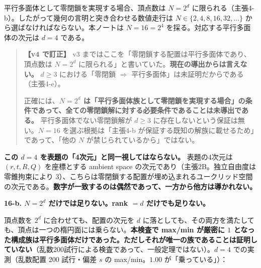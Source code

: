 \documentclass[
  10pt,
]{ltjsarticle}
\begin{document}
平行多面体として零閉鎖を実現する場合、頂点数は \(N = 2^d\)
に限られる（主張4-b）。したがって幾何の言明と突き合わせる数値走行は
\(N \in \{2, 4, 8, 16, 32, \dots\}\)
から選ばなければならない。本ノートは \(N = 16 = 2^4\)
を採る。対応する平行多面体の次元は \(d = 4\) である。

\begin{quote}
\textbf{【v4 で訂正】} v3
まではここを「零閉鎖する配置は平行多面体であり、頂点数は \(N=2^d\)
に限られる」と書いていた。\textbf{現在の導出からは言えない。} \(d\ge3\)
における「零閉鎖 \(\Rightarrow\)
平行多面体」は未証明だからである（主張4-e）。

正確には、\textbf{\(N = 2^d\)
は「平行多面体族として零閉鎖を実現する場合」の条件であって、全ての零閉鎖解に対する必要条件であることは未導出である。}
平行多面体でない零閉鎖解が \(d\ge3\)
に存在しないという保証は無い。\(N=16\) を選ぶ根拠は「主張4-b
が保証する既知の解族に載せるため」であって、「他の \(N\)
が禁じられているから」ではない。
\end{quote}

\textbf{この \(d = 4\) を表題の「4次元」と同一視してはならない。}
表題の4次元は \((r, t, R, Q)\) を座標とする ambient space
の次元であり（主張2B。独立自由度は零錐拘束により
3）、こちらは零閉鎖する配置が埋め込まれるユークリッド空間の次元である。\textbf{数字が一致するのは偶然であって、一方から他方は導かれない。}

\textbf{16-b. \(N = 2^d\) だけでは足りない。rank \(= d\)
だけでも足りない。}

頂点数を \(2^d\) に合わせても、配置の次元を \(d\)
に落としても、その両方を満たしても、頂点は一つの楕円面には乗らない。\textbf{本検査で
max/min が厳密に \(1\)
となった構成族は平行多面体だけであった。ただしそれが唯一の族であることは証明していない}（乱数200試行による検査であって、一般定理ではない）。\(d = 4\)
での実測（乱数配置 200 試行・偏差 \(s\) の max/min。\(1.00\)
が「乗っている」）：
\end{document}
